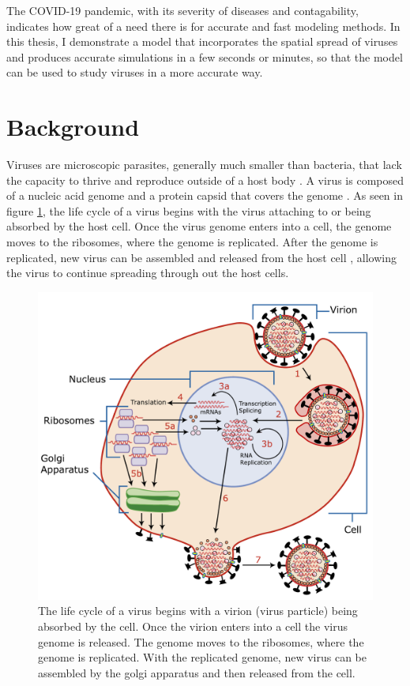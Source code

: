 The COVID-19 pandemic, with its severity of diseases and contagability, indicates
how great of a need there is for accurate and fast modeling methods. In this thesis, I demonstrate a model that incorporates the spatial spread of viruses and produces accurate simulations in a few seconds or minutes, so that the model can be used to study viruses in a more accurate way. 

\section{Background}
Viruses are microscopic parasites, generally much smaller than bacteria, that lack the capacity to thrive and reproduce outside of a host body \cite{website2}. A virus is composed of a nucleic acid genome and a protein capsid that covers the genome \cite{website3}. As seen in figure \ref{fig:Virus_Replication}, the life cycle of a virus begins with the virus attaching to or being absorbed by the host cell. Once the virus genome enters into a cell, the genome moves to the ribosomes, where the genome is replicated. After the genome is replicated, new virus can be assembled and released from the host cell \cite{Kaiser}, allowing the virus to continue spreading through out the host cells.

\begin{figure}[h]
    \centering
    \includegraphics[width=0.6\linewidth]{Figures/Virus_Replication_large.pdf}
    \caption{The life cycle of a virus begins with a virion (virus particle) being absorbed by the cell. Once the virion enters into a cell the virus genome is released. The genome moves to the ribosomes, where the genome is replicated. With the replicated genome, new virus can be assembled by the golgi apparatus and then released from the cell.}
    \label{fig:Virus_Replication}
\end{figure}

